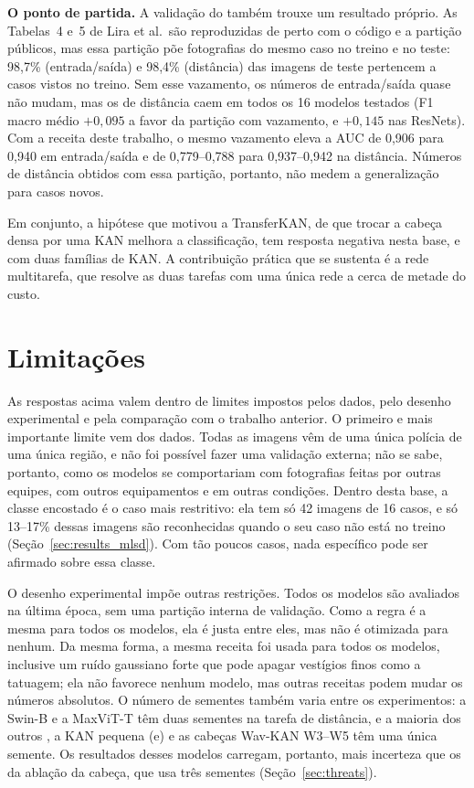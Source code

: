 \textbf{O ponto de partida.} A validação do  também trouxe um resultado próprio. As Tabelas~4 e~5 de Lira et al.\ são reproduzidas de perto com o código e a partição públicos, mas essa partição põe fotografias do mesmo caso no treino e no teste: 98,7\% (entrada/saída) e 98,4\% (distância) das imagens de teste pertencem a casos vistos no treino. Sem esse vazamento, os números de entrada/saída quase não mudam, mas os de distância caem em todos os 16 modelos testados (F1 macro médio $+0{,}095$ a favor da partição com vazamento, e $+0{,}145$ nas ResNets). Com a receita deste trabalho, o mesmo vazamento eleva a AUC de 0,906 para 0,940 em entrada/saída e de 0,779--0,788 para 0,937--0,942 na distância. Números de distância obtidos com essa partição, portanto, não medem a generalização para casos novos.

Em conjunto, a hipótese que motivou a TransferKAN, de que trocar a cabeça densa por uma KAN melhora a classificação, tem resposta negativa nesta base, e com duas famílias de KAN. A contribuição prática que se sustenta é a rede multitarefa, que resolve as duas tarefas com uma única rede a cerca de metade do custo.

\section{Limitações}
\label{sec:limitations}

As respostas acima valem dentro de limites impostos pelos dados, pelo desenho experimental e pela comparação com o trabalho anterior. O primeiro e mais importante limite vem dos dados. Todas as imagens vêm de uma única polícia de uma única região, e não foi possível fazer uma validação externa; não se sabe, portanto, como os modelos se comportariam com fotografias feitas por outras equipes, com outros equipamentos e em outras condições. Dentro desta base, a classe encostado é o caso mais restritivo: ela tem só 42 imagens de 16 casos, e só 13--17\% dessas imagens são reconhecidas quando o seu caso não está no treino (Seção~\ref{sec:results_mlsd}). Com tão poucos casos, nada específico pode ser afirmado sobre essa classe.

O desenho experimental impõe outras restrições. Todos os modelos são avaliados na última época, sem uma partição interna de validação. Como a regra é a mesma para todos os modelos, ela é justa entre eles, mas não é otimizada para nenhum. Da mesma forma, a mesma receita foi usada para todos os modelos, inclusive um ruído gaussiano forte que pode apagar vestígios finos como a tatuagem; ela não favorece nenhum modelo, mas outras receitas podem mudar os números absolutos. O número de sementes também varia entre os experimentos: a Swin-B e a MaxViT-T têm duas sementes na tarefa de distância, e a maioria dos outros , a KAN pequena (e) e as cabeças Wav-KAN W3--W5 têm uma única semente. Os resultados desses modelos carregam, portanto, mais incerteza que os da ablação da cabeça, que usa três sementes (Seção~\ref{sec:threats}).

